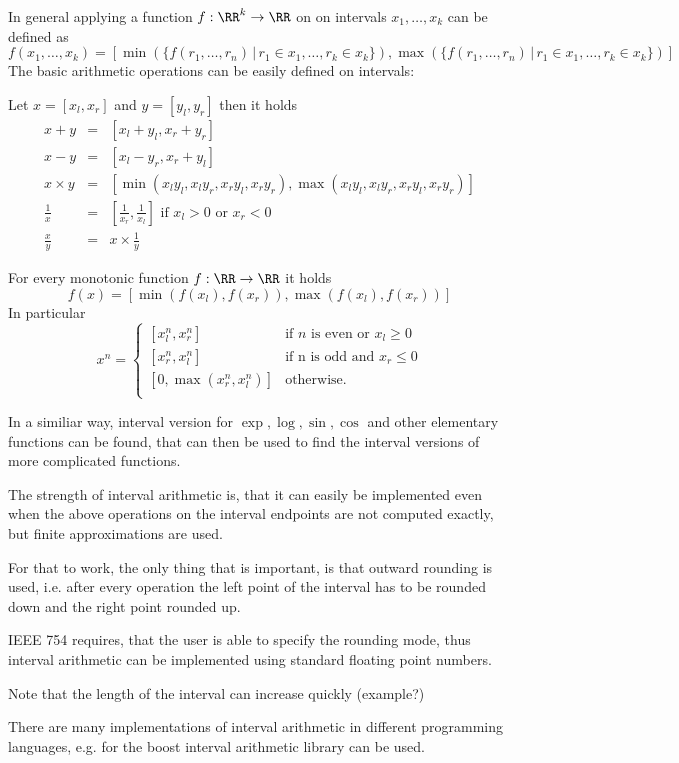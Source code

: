 	In general applying a function $f: \RR^k \to \RR$ on on intervals $x_1, \dots, x_k$ can be defined as
	\begin{equation}
		f(x_1, \dots, x_k) = [\min(\{f(r_1, \dots, r_n) \,|\, r_1 \in x_1, \dots, r_k\in x_k \}), \max(\{f(r_1, \dots, r_n) \,|\, r_1 \in x_1, \dots, r_k\in x_k \})]
	\end{equation}
	The basic arithmetic operations can be easily defined on intervals:
	\begin{theorem}
		Let $x = [x_l, x_r]$ and $y = [y_l, y_r]$ then it holds
		\begin{eqnarray}
			x + y  & = & [x_l + y_l, x_r + y_r] \\
			x - y  & = & [x_l - y_r, x_r + y_l] \\
			x \times y  & = & [\min(x_ly_l, x_ly_r, x_ry_l, x_ry_r), \max(x_ly_l, x_ly_r, x_ry_l, x_ry_r)] \\
			\frac{1}{x} & = & \left[\frac{1}{x_r}, \frac{1}{x_l} \right] \text{ if } x_l > 0 \text{ or } x_r < 0 \\
			\frac{x}{y} & = & x \times \frac{1}{y}   
		\end{eqnarray}
	\end{theorem}
	\begin{theorem}
		For every monotonic function $f: \RR \to \RR$ it holds
		$$ f(x) = [\min(f(x_l), f(x_r)), \max(f(x_l), f(x_r))] $$
		In particular
		\begin{equation}
			x^n  =   
				\begin{cases} 
					[x_l^n, x_r^n] &\mbox{if } n \mbox{ is even or } x_l \geq 0 \\
					[x_r^n, x_l^n] &\mbox{if n is odd and } x_r \leq 0 \\
					[0, \max(x_r^n, x_l^n)] & \mbox{otherwise.}  \\
				\end{cases} 
		\end{equation} 
	\end{theorem}
	In a similiar way, interval version for $\exp, \log, \sin, \cos$ and other elementary functions can be found, 
	that can then be used to find the interval versions of more complicated functions.

	The strength of interval arithmetic is, that it can easily be implemented even when the above 
	operations on the interval endpoints are not computed exactly, but finite approximations are used.
	
	For that to work, the only thing that is important, is that outward rounding is used, i.e. 
	after every operation the left point of the interval has to be rounded down and the right point rounded up.

	IEEE 754 requires, that the user is able to specify the rounding mode, thus interval arithmetic can be implemented 
	using standard floating point numbers.

	Note that the length of the interval can increase quickly  (example?)

	There are many implementations of interval arithmetic in different programming languages, e.g. 
	for \cc the boost interval arithmetic library can be used.

